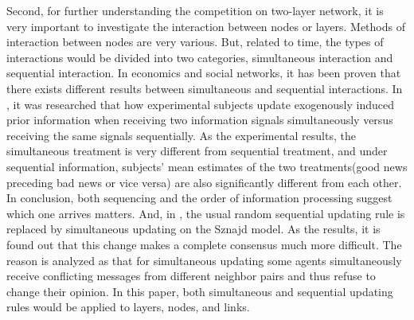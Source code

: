 Second, for further understanding the competition on two-layer network, it is very important to investigate the interaction between nodes or layers. Methods of interaction between nodes are very various.\parencite{sirbu2017} But, related to time, the types of interactions  would be divided into two categories, simultaneous interaction and sequential interaction. In economics and social networks, it has been proven that there exists different results between simultaneous and sequential interactions.\parencite{hoffman2011, dietrich2004} In \parencite{hoffman2011}, it was researched that how experimental subjects update exogenously induced prior information when receiving two information signals simultaneously versus receiving the same signals sequentially. As the experimental results, the simultaneous treatment is very different from sequential treatment, and under sequential information,  subjects’ mean estimates of the two treatments(good news preceding bad news or vice versa) are also significantly different from each other. In conclusion, both sequencing and the order of information processing suggest which one arrives matters. And, in \parencite{dietrich2004}, the usual random sequential updating rule is replaced  by simultaneous updating on the Sznajd model. As the results, it is found out that this change makes a complete consensus much more difficult. The reason is analyzed as that for simultaneous updating some agents simultaneously receive conflicting messages from different neighbor pairs and thus refuse to change their opinion. In this paper, both simultaneous and sequential updating rules would be applied to layers, nodes, and links. 

